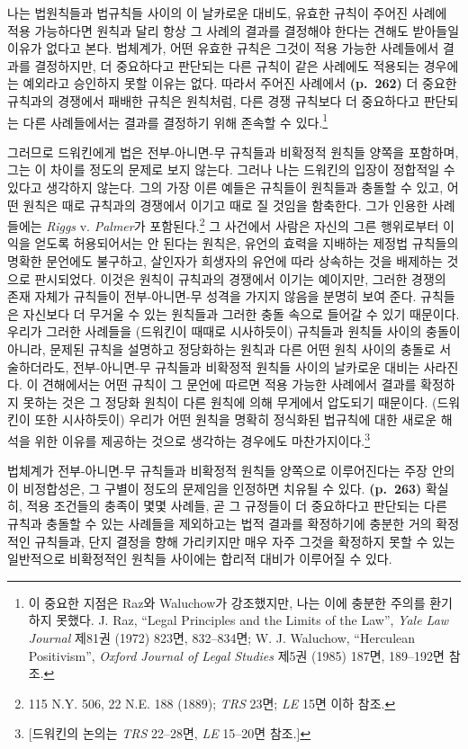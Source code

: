 나는 법원칙들과 법규칙들 사이의 이 날카로운 대비도, 유효한 규칙이 주어진
사례에 적용 가능하다면 원칙과 달리 항상 그 사례의 결과를 결정해야 한다는
견해도 받아들일 이유가 없다고 본다. 법체계가, 어떤 유효한 규칙은 그것이
적용 가능한 사례들에서 결과를 결정하지만, 더 중요하다고 판단되는 다른
규칙이 같은 사례에도 적용되는 경우에는 예외라고 승인하지 못할 이유는
없다. 따라서 주어진 사례에서 \textbf{(p.~262)} 더 중요한 규칙과의
경쟁에서 패배한 규칙은 원칙처럼, 다른 경쟁 규칙보다 더 중요하다고
판단되는 다른 사례들에서는 결과를 결정하기 위해 존속할 수
있다.\footnote{이 중요한 지점은 Raz와 Waluchow가 강조했지만, 나는 이에
  충분한 주의를 환기하지 못했다. J. Raz, “Legal Principles and the
  Limits of the Law”, \emph{Yale Law Journal} 제81권 (1972) 823면,
  832--834면; W. J. Waluchow, “Herculean Positivism”, \emph{Oxford
  Journal of Legal Studies} 제5권 (1985) 187면, 189--192면 참조.}

그러므로 드워킨에게 법은 전부-아니면-무 규칙들과 비확정적 원칙들 양쪽을
포함하며, 그는 이 차이를 정도의 문제로 보지 않는다. 그러나 나는 드워킨의
입장이 정합적일 수 있다고 생각하지 않는다. 그의 가장 이른 예들은
규칙들이 원칙들과 충돌할 수 있고, 어떤 원칙은 때로 규칙과의 경쟁에서
이기고 때로 질 것임을 함축한다. 그가 인용한 사례들에는 \emph{Riggs} v.
\emph{Palmer}가 포함된다.\footnote{115 N.Y. 506, 22 N.E. 188 (1889);
  \emph{TRS} 23면; \emph{LE} 15면 이하 참조.} 그 사건에서 사람은 자신의
그른 행위로부터 이익을 얻도록 허용되어서는 안 된다는 원칙은, 유언의
효력을 지배하는 제정법 규칙들의 명확한 문언에도 불구하고, 살인자가
희생자의 유언에 따라 상속하는 것을 배제하는 것으로 판시되었다. 이것은
원칙이 규칙과의 경쟁에서 이기는 예이지만, 그러한 경쟁의 존재 자체가
규칙들이 전부-아니면-무 성격을 가지지 않음을 분명히 보여 준다. 규칙들은
자신보다 더 무거울 수 있는 원칙들과 그러한 충돌 속으로 들어갈 수 있기
때문이다. 우리가 그러한 사례들을 (드워킨이 때때로 시사하듯이) 규칙들과
원칙들 사이의 충돌이 아니라, 문제된 규칙을 설명하고 정당화하는 원칙과
다른 어떤 원칙 사이의 충돌로 서술하더라도, 전부-아니면-무 규칙들과
비확정적 원칙들 사이의 날카로운 대비는 사라진다. 이 견해에서는 어떤
규칙이 그 문언에 따르면 적용 가능한 사례에서 결과를 확정하지 못하는 것은
그 정당화 원칙이 다른 원칙에 의해 무게에서 압도되기 때문이다. (드워킨이
또한 시사하듯이) 우리가 어떤 원칙을 명확히 정식화된 법규칙에 대한 새로운
해석을 위한 이유를 제공하는 것으로 생각하는 경우에도
마찬가지이다.\footnote{{[}드워킨의 논의는 \emph{TRS} 22--28면, \emph{LE}
  15--20면 참조.{]}}

법체계가 전부-아니면-무 규칙들과 비확정적 원칙들 양쪽으로 이루어진다는
주장 안의 이 비정합성은, 그 구별이 정도의 문제임을 인정하면 치유될 수
있다. \textbf{(p.~263)} 확실히, 적용 조건들의 충족이 몇몇 사례들, 곧 그
규정들이 더 중요하다고 판단되는 다른 규칙과 충돌할 수 있는 사례들을
제외하고는 법적 결과를 확정하기에 충분한 거의 확정적인 규칙들과, 단지
결정을 향해 가리키지만 매우 자주 그것을 확정하지 못할 수 있는 일반적으로
비확정적인 원칙들 사이에는 합리적 대비가 이루어질 수 있다.

